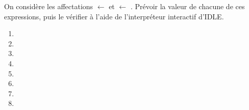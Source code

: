 On considère les affectations  $\leftarrow$  et  $\leftarrow$ .
Prévoir la valeur de chacune de ces expressions, puis le vérifier à l'aide de l'interpréteur interactif d'IDLE.

\begin{multicols}{4}
  \begin{enumerate}[label=\emph{\alph*)}]
    \item {}
    \item {}
    \item {}
    \item {}
    \item {}
    \item {}
    \item {}
    \item {}
  \end{enumerate}
\end{multicols}